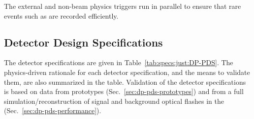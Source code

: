 The external and non-beam physics triggers run in parallel to ensure that rare events such as  are recorded efficiently. 

\subsection{Detector Design Specifications}
\label{sec:dp-pds-overview_specs}

The \dual {} detector specifications are given in Table~\ref{tab:specs:just:DP-PDS}. The physics-driven rationale for each detector specification, and the means to validate them, are also summarized in the table. Validation of the detector specifications is based on data from  prototypes (Sec.~\ref{sec:dp-pds-prototypes}) and from a full simulation/reconstruction of signal and background optical flashes in the \dpmod (Sec.~\ref{sec:dp-pds-performance}). 


%



